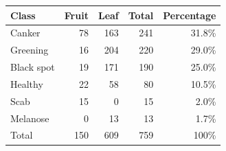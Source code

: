 \begin{tabular}{lrrrr}
\toprule
Class & Fruit & Leaf & Total & Percentage \\
\midrule
Canker & 78 & 163 & 241 & 31.8\% \\
Greening & 16 & 204 & 220 & 29.0\% \\
Black spot & 19 & 171 & 190 & 25.0\% \\
Healthy & 22 & 58 & 80 & 10.5\% \\
Scab & 15 & 0 & 15 & 2.0\% \\
Melanose & 0 & 13 & 13 & 1.7\% \\
\midrule
Total & 150 & 609 & 759 & 100\% \\
\bottomrule
\end{tabular}
